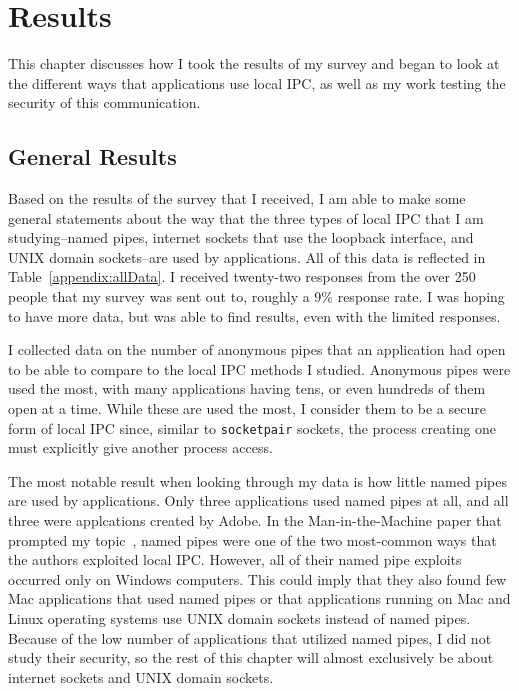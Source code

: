 \chapter{Results}
\label{sec:results}
This chapter discusses how I took the results of my survey and began to look at the different ways that applications use local IPC, as well as my work testing the security of this communication.

\section{General Results}
\label{sec:generalResults}
Based on the results of the survey that I received, I am able to make some general statements about the way that the three types of local IPC that I am studying--named pipes, internet sockets that use the loopback interface, and UNIX domain sockets--are used by applications.  All of this data is reflected in Table~\ref{appendix:allData}.  I received twenty-two responses from the over 250 people that my survey was sent out to, roughly a 9\% response rate.  I was hoping to have more data, but was able to find results, even with the limited responses.

I collected data on the number of anonymous pipes that an application had open to be able to compare to the local IPC methods I studied.  Anonymous pipes were used the most, with many applications having tens, or even hundreds of them open at a time.  While these are used the most, I consider them to be a secure form of local IPC since, similar to \texttt{socketpair} sockets, the process creating one must explicitly give another process access.

The most notable result when looking through my data is how little named pipes are used by applications.  Only three applications used named pipes at all, and all three were applcations created by Adobe.  In the Man-in-the-Machine paper that prompted my topic~\cite{MitMa}, named pipes were one of the two most-common ways that the authors exploited local IPC.  However, all of their named pipe exploits occurred only on Windows computers.  This could imply that they also found few Mac applications that used named pipes or that applications running on Mac and Linux operating systems use UNIX domain sockets instead of named pipes.  Because of the low number of applications that utilized named pipes, I did not study their security, so the rest of this chapter will almost exclusively be about internet sockets and UNIX domain sockets.


